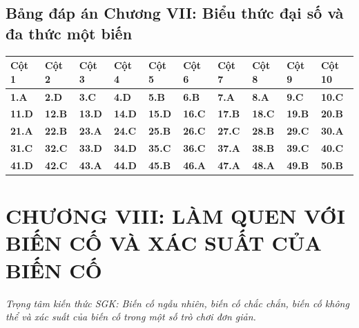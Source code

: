 \documentclass[11pt,a4paper]{article}
\begin{document}
\subsection*{\color{primary} Bảng đáp án Chương VII: Biểu thức đại số và đa thức một biến}
\begin{center}
\renewcommand{\arraystretch}{1.25}
\begin{tabularx}{\textwidth}{*{10}{>{\centering\arraybackslash}X}}
\toprule
\textbf{\color{primary} Cột 1} & \textbf{\color{primary} Cột 2} & \textbf{\color{primary} Cột 3} & \textbf{\color{primary} Cột 4} & \textbf{\color{primary} Cột 5} & \textbf{\color{primary} Cột 6} & \textbf{\color{primary} Cột 7} & \textbf{\color{primary} Cột 8} & \textbf{\color{primary} Cột 9} & \textbf{\color{primary} Cột 10} \\
\midrule
\textbf{1.A} & \textbf{2.D} & \textbf{3.C} & \textbf{4.D} & \textbf{5.B} & \textbf{6.B} & \textbf{7.A} & \textbf{8.A} & \textbf{9.C} & \textbf{10.C} \\
\rowcolor{rowtint} \textbf{11.D} & \textbf{12.B} & \textbf{13.D} & \textbf{14.D} & \textbf{15.D} & \textbf{16.C} & \textbf{17.B} & \textbf{18.C} & \textbf{19.B} & \textbf{20.B} \\
\textbf{21.A} & \textbf{22.B} & \textbf{23.A} & \textbf{24.C} & \textbf{25.B} & \textbf{26.C} & \textbf{27.C} & \textbf{28.B} & \textbf{29.C} & \textbf{30.A} \\
\rowcolor{rowtint} \textbf{31.C} & \textbf{32.C} & \textbf{33.D} & \textbf{34.D} & \textbf{35.C} & \textbf{36.C} & \textbf{37.A} & \textbf{38.B} & \textbf{39.C} & \textbf{40.C} \\
\textbf{41.D} & \textbf{42.C} & \textbf{43.A} & \textbf{44.D} & \textbf{45.B} & \textbf{46.A} & \textbf{47.A} & \textbf{48.A} & \textbf{49.B} & \textbf{50.B} \\
\bottomrule
\end{tabularx}
\end{center}\vspace{10pt}
\section*{\color{primary} CHƯƠNG VIII: LÀM QUEN VỚI BIẾN CỐ VÀ XÁC SUẤT CỦA BIẾN CỐ}
\textit{Trọng tâm kiến thức SGK: Biến cố ngẫu nhiên, biến cố chắc chắn, biến cố không thể và xác suất của biến cố trong một số trò chơi đơn giản.}\par\vspace{4pt}
\end{document}
